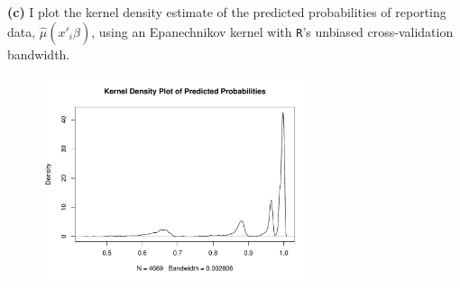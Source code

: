 \documentclass[12pt]{article}
\newcommand{\mtx}[1]{\ensuremath{\bm{\mathit{#1}}}}
\begin{document}
\textbf{(c)} I plot the kernel density estimate of the predicted probabilities of reporting data, $\hat{\mu}(\mtx{x}'_i\hat{\mtx{\beta}})$, using an Epanechnikov kernel with \verb|R|'s unbiased cross-validation bandwidth.

\begin{figure}[!htpb]
    \centering
    
        \includegraphics[width=0.7\textwidth]{kdens.pdf}

\end{figure}
\end{document}
